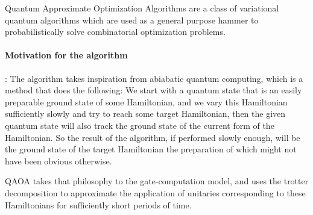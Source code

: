 Quantum Approximate Optimization Algorithms are a class of variational quantum algorithms which are used as a general purpose hammer to probabilistically solve combinatorial optimization problems.

\paragraph*{Motivation for the algorithm}: The algorithm takes inspiration from abiabatic quantum computing, which is a method that does the following: We start with a quantum state that is an easily preparable ground state of some Hamiltonian, and we vary this Hamiltonian sufficiently slowly and try to reach some target Hamiltonian, then the given quantum state will also track the ground state of the current form of the Hamiltonian. So the result of the algorithm, if performed slowly enough, will be the ground state of the target Hamiltonian the preparation of which might not have been obvious otherwise.

QAOA takes that philosophy to the gate-computation model, and uses the trotter decomposition to approximate the application of unitaries corresponding to these Hamiltonians for sufficiently short periods of time.

